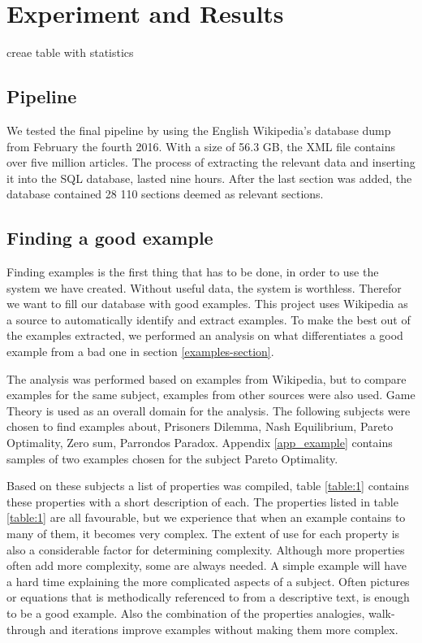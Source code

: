 
\chapter{Experiment and Results}
creae table with statistics

\section{Pipeline}
We tested the final pipeline by using the English Wikipedia's database dump from February the fourth 2016. With a size of 56.3 GB, the XML file contains over five million articles. The process of extracting the relevant data and inserting it into the SQL database, lasted nine hours. After the last section was added, the database contained 28 110 sections deemed as relevant sections.


\section{Finding a good example}
Finding examples is the first thing that has to be done, in order to use the system we have created. Without useful data, the system is worthless. Therefor we want to fill our database with good examples. This project uses Wikipedia as a source to automatically identify and extract examples. To make the best out of the examples extracted, we performed an analysis on what differentiates a good example from a bad one in section \ref{examples-section}.

The analysis was performed based on examples from Wikipedia, but to compare examples for the same subject, examples from other sources were also used. Game Theory is used as an overall domain for the analysis. The following subjects were chosen to find examples about, Prisoners Dilemma, Nash Equilibrium, Pareto Optimality, Zero sum, Parrondos Paradox. Appendix \ref{app_example} contains samples of two examples chosen for the subject Pareto Optimality. 

Based on these subjects a list of properties was compiled, table \ref{table:1} contains these properties with a short description of each. The properties listed in table \ref{table:1} are all favourable, but we experience that when an example contains to many of them, it becomes very complex. The extent of use for each property is also a considerable factor for determining complexity. Although more properties often add more complexity, some are always needed. A simple example will have a hard time explaining the more complicated aspects of a subject. Often pictures or equations that is methodically referenced to from a descriptive text, is enough to be a good example. Also the combination of the properties analogies, walk-through and iterations improve examples without making them more complex. 

